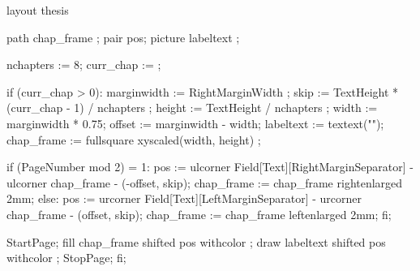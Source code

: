 \startenvironment layout
\product thesis


\usemodule[units]
\usemodule[bibtex]



\setupinteraction[state=start]
\setuppapersize[ThesisSize]
\setuplayout[location=middle, width=13.0cm, height=19.6cm, 
             topspace=1.7cm, bottomspace=1.7cm, margin=2.0cm, 
             header=0.5cm, footer=0.5cm]

{}

\setuppagenumbering[alternative=doublesided, location=right]

\definecolor[gray][s=0.25]
\definecolor[lightgray][s=0.75]
    path chap_frame ;
    pair pos;  
    picture labeltext ;
  
    nchapters := 8;
    curr_chap :=  ; 
  
    if (curr_chap > 0):
       marginwidth := RightMarginWidth ;
       skip   := TextHeight * (curr_chap - 1) / nchapters ;
       height := TextHeight / nchapters ;
       width  := marginwidth * 0.75;
       offset := marginwidth - width;
       labeltext := textext("\ssbfb \lightgray \getmarking[chapternumber]");
       chap_frame := fullsquare xyscaled(width, height) ;

       if (PageNumber mod 2) = 1:
           pos := ulcorner Field[Text][RightMarginSeparator] -
                  ulcorner chap_frame - (-offset, skip);
           chap_frame := chap_frame rightenlarged 2mm;
       else:
           pos := urcorner Field[Text][LeftMarginSeparator] -
                  urcorner chap_frame - (offset, skip);
           chap_frame := chap_frame leftenlarged 2mm;
       fi;

        StartPage;
            fill chap_frame shifted pos withcolor ;
            draw labeltext shifted pos withcolor ;
        StopPage;
    fi;
\stopuseMPgraphic

\setupbackgrounds[page][background=thumbindex]


